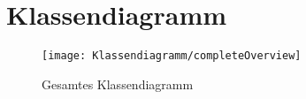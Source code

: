 \part{Klassendiagramm}
\begin{figure}[H]
	\centering
	\texttt{[image: Klassendiagramm/completeOverview]}
	\caption{Gesamtes Klassendiagramm}
	\label{fig:start}
\end{figure}